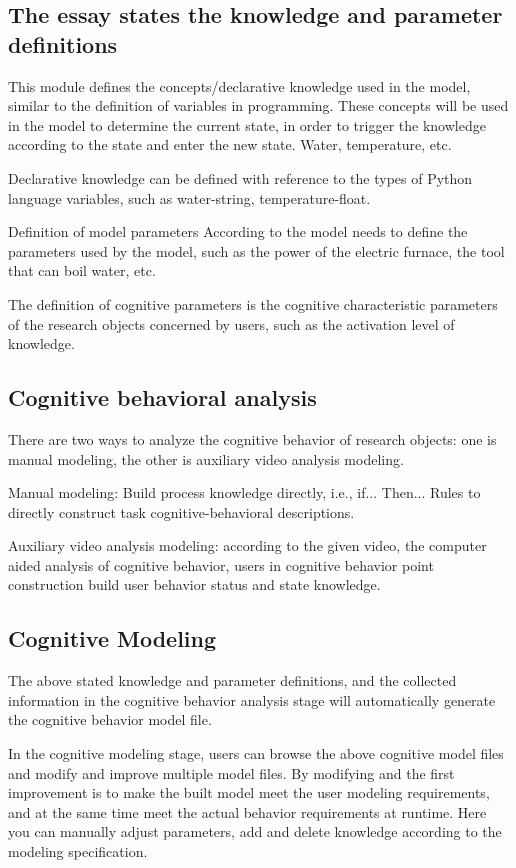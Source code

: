 \documentclass[twoside,11pt]{article}
\begin{document}
\subsection{The essay states the knowledge and parameter definitions}


This module defines the concepts/declarative knowledge used in the model, similar to the definition of variables in programming. These concepts will be used in the model to determine the current state, in order to trigger the knowledge according to the state and enter the new state. Water, temperature, etc.


Declarative knowledge can be defined with reference to the types of Python language variables, such as water-string, temperature-float.


Definition of model parameters According to the model needs to define the parameters used by the model, such as the power of the electric furnace, the tool that can boil water, etc.


The definition of cognitive parameters is the cognitive characteristic parameters of the research objects concerned by users, such as the activation level of knowledge.


\subsection{Cognitive behavioral analysis}


There are two ways to analyze the cognitive behavior of research objects: one is manual modeling, the other is auxiliary video analysis modeling.


Manual modeling: Build process knowledge directly, i.e., if... Then... Rules to directly construct task cognitive-behavioral descriptions.


Auxiliary video analysis modeling: according to the given video, the computer aided analysis of cognitive behavior, users in cognitive behavior point construction build user behavior status and state knowledge.


\subsection{Cognitive Modeling}


The above stated knowledge and parameter definitions, and the collected information in the cognitive behavior analysis stage will automatically generate the cognitive behavior model file.


In the cognitive modeling stage, users can browse the above cognitive model files and modify and improve multiple model files. By modifying and the first improvement is to make the built model meet the user modeling requirements, and at the same time meet the actual behavior requirements at runtime. Here you can manually adjust parameters, add and delete knowledge according to the modeling specification.
\end{document}

